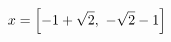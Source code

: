 \documentclass[preview]{standalone}
\begin{document}
\begin{align*}
\special{dvisvgm:raw <g id='unique000'>}x=\left[ -1 + \sqrt{2}, \  - \sqrt{2} - 1\right]\special{dvisvgm:raw </g>}
\end{align*}
\end{document}
